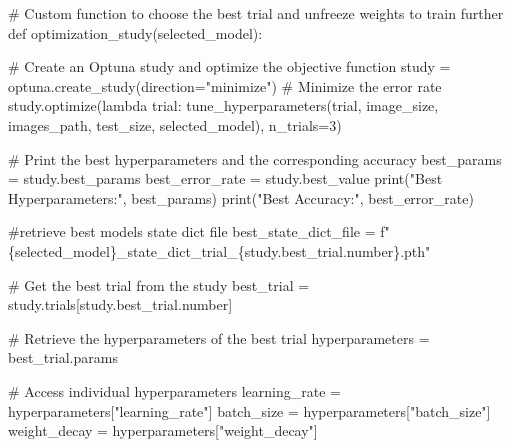 \documentclass[
  letterpaper,
  DIV=11,
  numbers=noendperiod]{scrartcl}
\newenvironment{Shaded}{\begin{snugshade}}{\end{snugshade}}
\newcommand{\BuiltInTok}[1]{\textcolor[rgb]{0.00,0.23,0.31}{#1}}
\newcommand{\CommentTok}[1]{\textcolor[rgb]{0.37,0.37,0.37}{#1}}
\newcommand{\DecValTok}[1]{\textcolor[rgb]{0.68,0.00,0.00}{#1}}
\newcommand{\KeywordTok}[1]{\textcolor[rgb]{0.00,0.23,0.31}{#1}}
\newcommand{\NormalTok}[1]{\textcolor[rgb]{0.00,0.23,0.31}{#1}}
\newcommand{\OperatorTok}[1]{\textcolor[rgb]{0.37,0.37,0.37}{#1}}
\newcommand{\SpecialCharTok}[1]{\textcolor[rgb]{0.37,0.37,0.37}{#1}}
\newcommand{\SpecialStringTok}[1]{\textcolor[rgb]{0.13,0.47,0.30}{#1}}
\newcommand{\StringTok}[1]{\textcolor[rgb]{0.13,0.47,0.30}{#1}}
\begin{document}
\hfill\break

\hypertarget{custom-optstudy}{}
\begin{Shaded}
\begin{Highlighting}[]
\CommentTok{\# Custom function to choose the best trial and unfreeze weights to train further}
\KeywordTok{def}\NormalTok{ optimization\_study(selected\_model):}

    \CommentTok{\# Create an Optuna study and optimize the objective function}
\NormalTok{    study }\OperatorTok{=}\NormalTok{ optuna.create\_study(direction}\OperatorTok{=}\StringTok{"minimize"}\NormalTok{) }\CommentTok{\# Minimize the error rate}
\NormalTok{    study.optimize(}\KeywordTok{lambda}\NormalTok{ trial: tune\_hyperparameters(trial, image\_size, images\_path, test\_size, selected\_model), n\_trials}\OperatorTok{=}\DecValTok{3}\NormalTok{)}

    \CommentTok{\# Print the best hyperparameters and the corresponding accuracy}
\NormalTok{    best\_params }\OperatorTok{=}\NormalTok{ study.best\_params}
\NormalTok{    best\_error\_rate }\OperatorTok{=}\NormalTok{ study.best\_value}
    \BuiltInTok{print}\NormalTok{(}\StringTok{"Best Hyperparameters:"}\NormalTok{, best\_params)}
    \BuiltInTok{print}\NormalTok{(}\StringTok{"Best Accuracy:"}\NormalTok{, best\_error\_rate)}

    \CommentTok{\#retrieve best model\textquotesingle{}s state dict file}
\NormalTok{    best\_state\_dict\_file }\OperatorTok{=} \SpecialStringTok{f"}\SpecialCharTok{\{}\NormalTok{selected\_model}\SpecialCharTok{\}}\SpecialStringTok{\_state\_dict\_trial\_}\SpecialCharTok{\{}\NormalTok{study}\SpecialCharTok{.}\NormalTok{best\_trial}\SpecialCharTok{.}\NormalTok{number}\SpecialCharTok{\}}\SpecialStringTok{.pth"}

    \CommentTok{\# Get the best trial from the study}
\NormalTok{    best\_trial }\OperatorTok{=}\NormalTok{ study.trials[study.best\_trial.number]}

    \CommentTok{\# Retrieve the hyperparameters of the best trial}
\NormalTok{    hyperparameters }\OperatorTok{=}\NormalTok{ best\_trial.params}

    \CommentTok{\# Access individual hyperparameters}
\NormalTok{    learning\_rate }\OperatorTok{=}\NormalTok{ hyperparameters[}\StringTok{"learning\_rate"}\NormalTok{]}
\NormalTok{    batch\_size }\OperatorTok{=}\NormalTok{ hyperparameters[}\StringTok{"batch\_size"}\NormalTok{]}
\NormalTok{    weight\_decay }\OperatorTok{=}\NormalTok{ hyperparameters[}\StringTok{"weight\_decay"}\NormalTok{]}


\end{Highlighting}
\end{Shaded}
\end{document}
